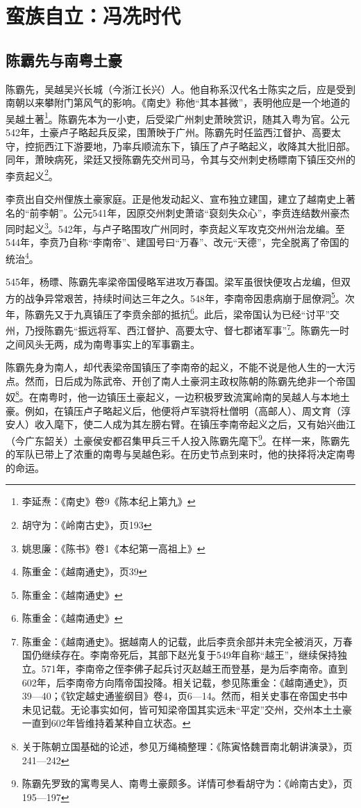 \chapter{蛮族自立：冯冼时代}

\section{陈霸先与南粤土豪}

\indent 陈霸先，吴越吴兴长城（今浙江长兴）人。他自称系汉代名士陈实之后，应是受到南朝以来攀附门第风气的影响。《南史》称他“其本甚微”，表明他应是一个地道的吴越土著\footnote{李延焘：《南史》卷9《陈本纪上第九》}。陈霸先本为一小吏，后受梁广州刺史萧映赏识，随其入粤为官。公元542年，土豪卢子略起兵反梁，围萧映于广州。陈霸先时任监西江督护、高要太守，控扼西江下游要地，乃率兵顺流东下，镇压了卢子略起义，收降其大批旧部。同年，萧映病死，梁廷又授陈霸先交州司马，令其与交州刺史杨瞟南下镇压交州的李贲起义\footnote{胡守为：《岭南古史》，页193}。

李贲出自交州俚族土豪家庭。正是他发动起义、宣布独立建国，建立了越南史上著名的“前李朝”。公元541年，因原交州刺史萧谘“裒刻失众心”，李贲连结数州豪杰同时起义\footnote{姚思廉：《陈书》卷1《本纪第一高祖上》}。542年，与卢子略围攻广州同时，李贲起义军攻克交州州治龙编。至544年，李贲乃自称“李南帝”、建国号曰“万春”、改元“天德”，完全脱离了帝国的统治\footnote{陈重金：《越南通史》，页39}。

545年，杨㬓、陈霸先率梁帝国侵略军进攻万春国。梁军虽很快便攻占龙编，但双方的战争异常艰苦，持续时间达三年之久。548年，李南帝因患病崩于屈僚洞\footnote{陈重金：《越南通史》}。次年，陈霸先又于九真镇压了李贲余部的抵抗\footnote{陈重金：《越南通史》}。此后，梁帝国认为已经“讨平”交州，乃授陈霸先“振远将军、西江督护、高要太守、督七郡诸军事”\footnote{陈重金：《越南通史》。据越南人的记载，此后李贲余部并未完全被消灭，万春国仍继续存在。李南帝死后，其部下赵光复于549年自称“越王”，继续保持独立。571年，李南帝之侄李佛子起兵讨灭赵越王而登基，是为后李南帝。直到602年，后李南帝方向隋帝国投降。相关记载，参见陈重金：《越南通史》，页39—40；《钦定越史通鉴纲目》卷4，页6—14。然而，相关史事在帝国史书中未见记载。无论事实如何，皆可知梁帝国其实远未“平定”交州，交州本土土豪一直到602年皆维持着某种自立状态。}。陈霸先一时之间风头无两，成为南粤事实上的军事霸主。

陈霸先身为南人，却代表梁帝国镇压了李南帝的起义，不能不说是他人生的一大污点。然而，日后成为陈武帝、开创了南人土豪洞主政权陈朝的陈霸先绝非一个帝国奴\footnote{关于陈朝立国基础的论述，参见万绳楠整理：《陈寅恪魏晋南北朝讲演录》，页241—242}。在南粤时，他一边镇压土豪起义，一边积极罗致流寓岭南的吴越人与本地土豪。例如，在镇压卢子略起义后，他便将卢军骁将杜僧明（高邮人）、周文育（淳安人）收入麾下，使二人成为其左膀右臂。在镇压李南帝起义之后，又有始兴曲江（今广东韶关）土豪侯安都召集甲兵三千人投入陈霸先麾下\footnote{陈霸先罗致的寓粤吴人、南粤土豪颇多。详情可参看胡守为：《岭南古史》，页195—197}。在样一来，陈霸先的军队已带上了浓重的南粤与吴越色彩。在历史节点到来时，他的抉择将决定南粤的命运。

